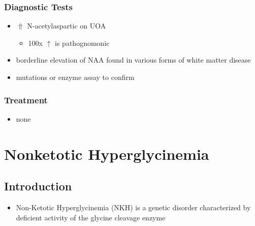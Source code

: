 \documentclass{scrartcl}
\begin{document}
\subsubsection{Diagnostic Tests}
\label{sec:org8c2c291}
\begin{itemize}
\item \(\Uparrow\) N-acetylaspartic on UOA
\begin{itemize}
\item 100x \(\uparrow\) is pathognomonic
\end{itemize}
\item borderline elevation of NAA found in various forms of white matter
disease
\item mutations or enzyme assay to confirm
\end{itemize}

\subsubsection{Treatment}
\label{sec:orgd6d10be}
\begin{itemize}
\item none
\end{itemize}

\section{Nonketotic Hyperglycinemia}
\label{sec:org7ba7a45}
\subsection{Introduction}
\label{sec:org0a5168a}
\begin{itemize}
\item Non-Ketotic Hyperglycinemia (NKH) is a genetic disorder characterized
by deficient activity of the glycine cleavage enzyme
\end{itemize}

\chemnameinit{}
\end{document}
